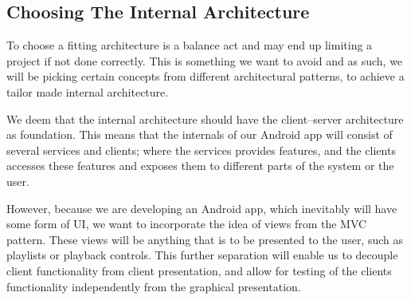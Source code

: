 \subsection{Choosing The Internal Architecture}
To choose a fitting architecture is a balance act and may end up limiting a project if not done correctly.
This is something we want to avoid and as such, we will be picking certain concepts from different architectural patterns, to achieve a tailor made internal architecture.

We deem that the internal architecture should have the client--server architecture as foundation.
This means that the internals of our Android app will consist of several services and clients;
where the services provides features, and the clients accesses these features and exposes them to different parts of the system or the user.

However, because we are developing an Android app, which inevitably will have some form of \ac{UI}, we want to incorporate the idea of views from the \ac{MVC} pattern.
These views will be anything that is to be presented to the user, such as playlists or playback controls.
This further separation will enable us to decouple client functionality from client presentation, and allow for testing of the clients functionality independently from the graphical presentation.


